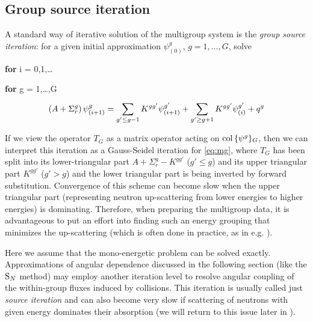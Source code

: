 \subsection{Group source iteration}
A standard way of iterative solution of the multigroup system is the \textit{group source iteration}: for a given
initial approximation $\psi^g_{(0)}$, $g = 1,\ldots,G$, solve
\begin{myitemize}
  \item \textbf{for} i = 0,1,\ldots
  \begin{myitemize}
  \item \textbf{for} g = 1,\ldots,G
  \vspace*{-.5em}
	\begin{equation}\label{eq:MGGS}
		\left(A + \Sigma_r^g\right)\psi^g_{(i+1)} = \sum_{g'\leq g-1}^{} K^{gg'}\psi^{g'}_{(i+1)} + \sum_{g' \geq g+1}^{}
	  K^{gg'}\psi^{g'}_{(i)} + q^g
	\end{equation}  
 \end{myitemize}
\end{myitemize}
If we view the operator $T_G$ as a matrix operator acting on $\operatorname{col\,} \{\psi^g\}_G$, then we can interpret
this iteration as a Gauss-Seidel iteration for \eqref{eq:mg}, where $T_G$
has been split into its lower-triangular part $A + \Sigma_r^g - K^{gg'}$ ($g'\leq g$) and its upper triangular part 
$K^{gg'}$ ($g'> g$) and the lower triangular part is being inverted by forward substitution. Convergence of this scheme can become slow when the upper triangular part (representing neutron up-scattering
from lower energies to higher energies) is dominating. Therefore, when preparing the multigroup data, it is
advantageous to put an effort into finding such an energy grouping that minimizes the up-scattering (which is often
done in practice, as in e.g. \cite{mox-bench}).
\begin{remark}\label{rem:SI}
Here we assume that the
mono-energetic problem can be solved exactly. Approximations of angular dependence discussed in the following
section (like the $\text{S}_{N}$ method) may employ another iteration level to resolve angular
coupling of the within-group fluxes induced by collisions. This iteration is usually called just \textit{source
iteration} and can also become very slow if scattering of neutrons with given energy dominates their absorption (we will
return to this issue later in ).
\end{remark}

